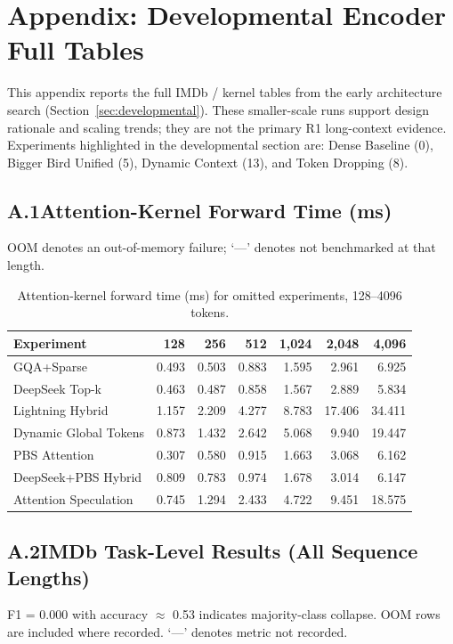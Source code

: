 \section*{Appendix: Developmental Encoder Full Tables}

This appendix reports the full IMDb / kernel tables from the early architecture
search (Section~\ref{sec:developmental}). These smaller-scale runs support
design rationale and scaling trends; they are not the primary R1 long-context
evidence. Experiments highlighted in the developmental section are: Dense
Baseline (0), Bigger Bird Unified (5), Dynamic Context (13), and Token
Dropping (8).

\subsection*{A.1\quad Attention-Kernel Forward Time (ms)}
OOM denotes an out-of-memory failure; `---' denotes not benchmarked at that length.

\begin{table}[ht]
  \centering
  \small
  \caption{Attention-kernel forward time (ms) for omitted experiments, 128--4096 tokens.}
  \label{tab:app-kernel}
  \begin{tabular}{@{}lrrrrrr@{}}
    \toprule
    Experiment & 128 & 256 & 512 & 1,024 & 2,048 & 4,096 \\
    \midrule
    GQA+Sparse & 0.493 & 0.503 & 0.883 & 1.595 & 2.961 & 6.925 \\
    DeepSeek Top-k & 0.463 & 0.487 & 0.858 & 1.567 & 2.889 & 5.834 \\
    Lightning Hybrid & 1.157 & 2.209 & 4.277 & 8.783 & 17.406 & 34.411 \\
    Dynamic Global Tokens & 0.873 & 1.432 & 2.642 & 5.068 & 9.940 & 19.447 \\
    PBS Attention & 0.307 & 0.580 & 0.915 & 1.663 & 3.068 & 6.162 \\
    DeepSeek+PBS Hybrid & 0.809 & 0.783 & 0.974 & 1.678 & 3.014 & 6.147 \\
    Attention Speculation & 0.745 & 1.294 & 2.433 & 4.722 & 9.451 & 18.575 \\
    \bottomrule
  \end{tabular}
\end{table}

\FloatBarrier

\subsection*{A.2\quad IMDb Task-Level Results (All Sequence Lengths)}
F1 = 0.000 with accuracy $\approx$ 0.53 indicates majority-class collapse.
OOM rows are included where recorded. `---' denotes metric not recorded.

